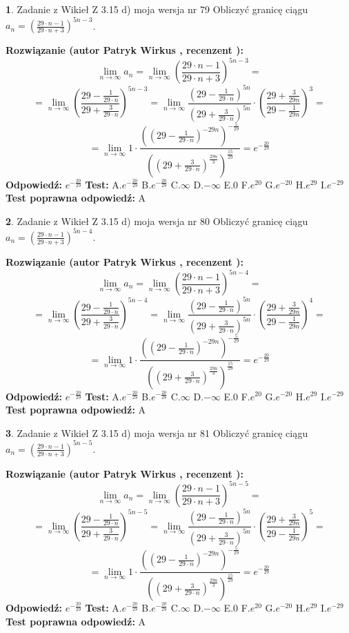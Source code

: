 \documentclass[12pt, a4paper]{article}
\theoremstyle{definition} %
\newtheorem{zad}{}
\newcommand{\zadStart}[1]{\begin{zad}#1\newline}
\newcommand{\zadStop}{\end{zad}}
\newcommand{\rozwStart}[2]{\noindent \textbf{Rozwiązanie (autor #1 , recenzent #2): }\newline}
\newcommand{\rozwStop}{\newline}
\newcommand{\odpStart}{\noindent \textbf{Odpowiedź:}\newline}
\newcommand{\odpStop}{\newline}
\newcommand{\testStart}{\noindent \textbf{Test:}\newline}
\newcommand{\testStop}{\newline}
\newcommand{\kluczStart}{\noindent \textbf{Test poprawna odpowiedź:}\newline}
\newcommand{\kluczStop}{\newline}
\begin{document}
\zadStart{Zadanie z Wikieł Z 3.15 d) moja wersja nr 79}
Obliczyć granicę ciągu $a_{n}=(\frac{29\cdot n - 1}{29 \cdot n + 3})^{5n-3}$.
\zadStop
\rozwStart{Patryk Wirkus}{}
$$\lim\limits_{n\to\infty} a_{n} = \lim\limits_{n\to\infty}(\frac{29\cdot n - 1}{29 \cdot n + 3})^{5n-3}=$$
$$=\lim\limits_{n\to\infty}(\frac{29 - \frac{1}{29\cdot n}}{29 + \frac{3}{29 \cdot n}})^{5n-3}=\lim\limits_{n\to\infty}\frac{(29 - \frac{1}{29\cdot n})^{5n}}{(29 + \frac{3}{29\cdot n})^{5n}} \cdot (\frac{29+\frac{3}{29n}}{29-\frac{1}{29n}})^{3}=$$
$$=\lim\limits_{n\to\infty} 1 \cdot \frac{((29-\frac{1}{29 \cdot n})^{-29n})^{-\frac{5}{29}}}{((29+\frac{3}{29 \cdot n})^{\frac{29n}{3}})^{\frac{15}{29}}} =e^{-\frac{20}{29}}$$
\rozwStop
\odpStart
$e^{-\frac{20}{29}}$
\odpStop
\testStart
A.$ e^{-\frac{20}{29}}$
B.$ e^{-\frac{20}{29}}$
C.$\infty$
D.$-\infty$
E.$0$
F.$e^{20}$
G.$e^{-20}$
H.$e^{29}$
I.$e^{-29}$
\testStop
\kluczStart
A
\kluczStop



\zadStart{Zadanie z Wikieł Z 3.15 d) moja wersja nr 80}
Obliczyć granicę ciągu $a_{n}=(\frac{29\cdot n - 1}{29 \cdot n + 3})^{5n-4}$.
\zadStop
\rozwStart{Patryk Wirkus}{}
$$\lim\limits_{n\to\infty} a_{n} = \lim\limits_{n\to\infty}(\frac{29\cdot n - 1}{29 \cdot n + 3})^{5n-4}=$$
$$=\lim\limits_{n\to\infty}(\frac{29 - \frac{1}{29\cdot n}}{29 + \frac{3}{29 \cdot n}})^{5n-4}=\lim\limits_{n\to\infty}\frac{(29 - \frac{1}{29\cdot n})^{5n}}{(29 + \frac{3}{29\cdot n})^{5n}} \cdot (\frac{29+\frac{3}{29n}}{29-\frac{1}{29n}})^{4}=$$
$$=\lim\limits_{n\to\infty} 1 \cdot \frac{((29-\frac{1}{29 \cdot n})^{-29n})^{-\frac{5}{29}}}{((29+\frac{3}{29 \cdot n})^{\frac{29n}{3}})^{\frac{15}{29}}} =e^{-\frac{20}{29}}$$
\rozwStop
\odpStart
$e^{-\frac{20}{29}}$
\odpStop
\testStart
A.$ e^{-\frac{20}{29}}$
B.$ e^{-\frac{20}{29}}$
C.$\infty$
D.$-\infty$
E.$0$
F.$e^{20}$
G.$e^{-20}$
H.$e^{29}$
I.$e^{-29}$
\testStop
\kluczStart
A
\kluczStop



\zadStart{Zadanie z Wikieł Z 3.15 d) moja wersja nr 81}
Obliczyć granicę ciągu $a_{n}=(\frac{29\cdot n - 1}{29 \cdot n + 3})^{5n-5}$.
\zadStop
\rozwStart{Patryk Wirkus}{}
$$\lim\limits_{n\to\infty} a_{n} = \lim\limits_{n\to\infty}(\frac{29\cdot n - 1}{29 \cdot n + 3})^{5n-5}=$$
$$=\lim\limits_{n\to\infty}(\frac{29 - \frac{1}{29\cdot n}}{29 + \frac{3}{29 \cdot n}})^{5n-5}=\lim\limits_{n\to\infty}\frac{(29 - \frac{1}{29\cdot n})^{5n}}{(29 + \frac{3}{29\cdot n})^{5n}} \cdot (\frac{29+\frac{3}{29n}}{29-\frac{1}{29n}})^{5}=$$
$$=\lim\limits_{n\to\infty} 1 \cdot \frac{((29-\frac{1}{29 \cdot n})^{-29n})^{-\frac{5}{29}}}{((29+\frac{3}{29 \cdot n})^{\frac{29n}{3}})^{\frac{15}{29}}} =e^{-\frac{20}{29}}$$
\rozwStop
\odpStart
$e^{-\frac{20}{29}}$
\odpStop
\testStart
A.$ e^{-\frac{20}{29}}$
B.$ e^{-\frac{20}{29}}$
C.$\infty$
D.$-\infty$
E.$0$
F.$e^{20}$
G.$e^{-20}$
H.$e^{29}$
I.$e^{-29}$
\testStop
\kluczStart
A
\kluczStop
\end{document}
